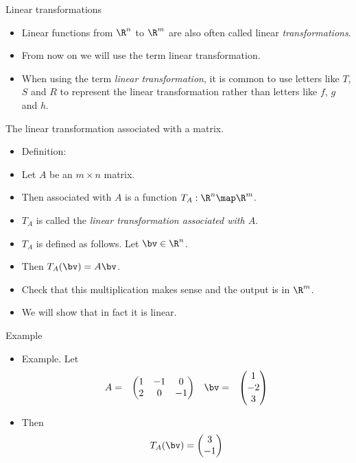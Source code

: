 \documentclass{beamer}
\begin{document}

\begin{frame}{Linear transformations}

\begin{itemize}
\item Linear functions from $\R^n$ to $\R^m$ are also often called
linear \emph{transformations}.
\item From now on we will use the term linear transformation.
\item When using the term \emph{linear transformation}, it is common to use
letters like $T$, $S$ and $R$ to represent the linear transformation rather
than letters like $f$, $g$ and $h$.
\end{itemize}

\end{frame}


\begin{frame}{The linear transformation associated with a matrix.}

\begin{itemize}
\item Definition:
\item Let $A$ be an $m\times n$ matrix.
\item Then associated with $A$ is a function $T_A:\R^n\map\R^m$.
\item $T_A$ is called the \emph{linear transformation associated with $A$}.
\item $T_A$ is defined as follows. Let $\bv\in\R^n$.
\item Then $T_A(\bv) = A \bv$.
\item Check that this multiplication makes sense and the output is in $\R^m$.
\item We will show that in fact it is linear.
\end{itemize}
\end{frame}


\begin{frame}{Example}

\begin{itemize}
\item Example. Let
$$
\begin{matrix}
A =
&
\begin{pmatrix}
1 & -1  & 0 \\
2 &  0  & -1
\end{pmatrix}
&
\bv =
&
\begin{pmatrix}
1 \\ -2 \\ 3
\end{pmatrix}
\end{matrix}
$$
\item Then
$$
T_A(\bv) =
\begin{pmatrix}
3 \\-1
\end{pmatrix}
$$
\end{itemize}

\end{frame}
\end{document}
